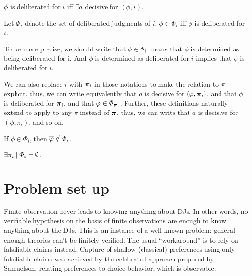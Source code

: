 \documentclass[version=3.21, pagesize, twoside=off, bibliography=totoc, DIV=calc, fontsize=12pt, a4paper]{scrartcl}
\begin{document}
\begin{definition}
	$\phi$ is deliberated for $i$ iff $\exists a$ decisive for $(\phi, i)$.
\end{definition}
Let $\Phi_i$ denote the set of deliberated judgments of $i$: $\phi \in \Phi_i$ iff $\phi$ is deliberated for $i$.
\begin{remark}[Determined DJ VS DJ]
	To be more precise, we should write that $\phi \in \Phi_i$ means that $\phi$ is determined as being deliberated for i. And $\phi$ is determined as deliberated for $i$ implies that $\phi$ is deliberated for $i$.
\end{remark}
\begin{remark}[$i$ VS $\pib_i$]
	We can also replace $i$ with $\pib_i$ in those notations to make the relation to $\bm{\pi}$ explicit, thus, we can write equivalently that $a$ is decisive for $(\varphi, \bm{\pi}_i)$, and that $\phi$ is deliberated for $\pib_i$, and that $\varphi \in \Phi_{\bm{\pi}_i}$. Further, these definitions naturally extend to apply to any $\pi$ instead of $\bm{\pi}$, thus, we can write that $a$ is decisive for $(\phi, \pi_i)$, and so on.
\end{remark}

\begin{proposition}
	If $\phi \in \Phi_i$, then $\overline{\varphi} \notin \Phi_i$.
\end{proposition}
\begin{proposition}[Incompleteness]
	$\exists \pi_i \suchthat \Phi_i = \emptyset$.
\end{proposition}

\section{Problem set up}
Finite observation never leads to knowing anything about DJs.
In other words, no verifiable hypothesis on the basis of finite observations are enough to know anything about the DJs. This is an instance of a well known problem: general enough theories can’t be finitely verified.
The usual “workaround” is to rely on falsifiable claims instead.
Capture of shallow (classical) preferences using only falsifiable claims was achieved by the celebrated approach proposed by Samuelson, relating preferences to choice behavior, which is observable.
\end{document}
